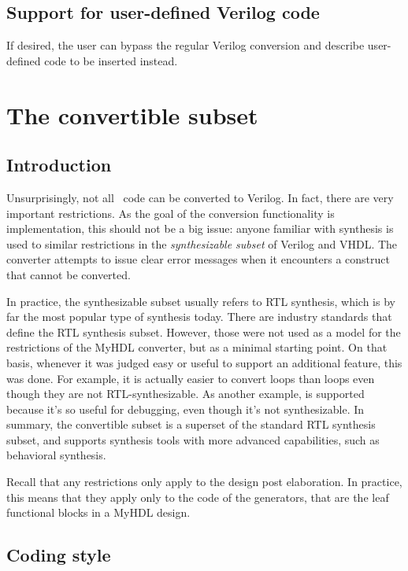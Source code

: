 \subsection{Support for user-defined Verilog code \label{conf-features-udfv}}
If desired, the user can bypass the regular Verilog conversion
and describe user-defined code to be inserted instead.

\section{The convertible subset\label{conv-subset}}

\subsection{Introduction\label{conv-subset-intro}}

Unsurprisingly, not all \myhdl\ code can be converted to Verilog. In
fact, there are very important restrictions.  As the goal of the
conversion functionality is implementation, this should not be a big
issue: anyone familiar with synthesis is used to similar restrictions
in the \emph{synthesizable subset} of Verilog and VHDL. The converter
attempts to issue clear error messages when it encounters a construct
that cannot be converted. 

In practice, the synthesizable subset usually refers to RTL synthesis,
which is by far the most popular type of synthesis today. There are
industry standards that define the RTL synthesis subset.  However,
those were not used as a model for the restrictions of the MyHDL
converter, but as a minimal starting point.  On that basis, whenever
it was judged easy or useful to support an additional feature, this
was done. For example, it is actually easier to convert
 loops than  loops even though they are
not RTL-synthesizable.  As another example,  is
supported because it's so useful for debugging, even though it's not
synthesizable.  In summary, the convertible subset is a superset of
the standard RTL synthesis subset, and supports synthesis tools with
more advanced capabilities, such as behavioral synthesis.

Recall that any restrictions only apply to the design post
elaboration.  In practice, this means that they apply only to the code
of the generators, that are the leaf functional blocks in a MyHDL
design.

\subsection{Coding style\label{conv-subset-style}}

